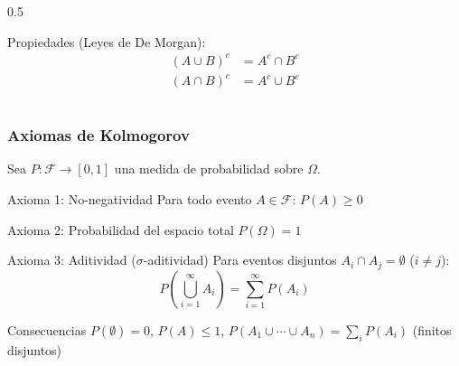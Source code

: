 \documentclass[aspectratio=169,11pt]{beamer}
\begin{document}
\begin{frame}[fragile]
\begin{columns}[T]
\begin{column}{0.5\textwidth}
\begin{center}

\pause
\vspace{0.3cm}
Propiedades (Leyes de De Morgan):
\begin{align*}
(A \cup B)^c &= A^c \cap B^c \\
(A \cap B)^c &= A^c \cup B^c
\end{align*}
\end{center}
\end{column}
\end{columns}
\end{frame}

\begin{frame}[fragile]
\frametitle{Axiomas de Kolmogorov}

\small
Sea $P: \mathcal{F} \to [0,1]$ una medida de probabilidad sobre $\Omega$.

\pause
\vspace{-0.1cm}
\begin{block}{Axioma 1: No-negatividad}
Para todo evento $A \in \mathcal{F}$: $P(A) \geq 0$
\end{block}

\pause
\vspace{-0.1cm}
\begin{block}{Axioma 2: Probabilidad del espacio total}
$P(\Omega) = 1$
\end{block}

\pause
\vspace{-0.1cm}
\begin{block}{Axioma 3: Aditividad ($\sigma$-aditividad)}
Para eventos disjuntos $A_i \cap A_j = \emptyset$ ($i \neq j$):
$$P\left(\bigcup_{i=1}^{\infty} A_i\right) = \sum_{i=1}^{\infty} P(A_i)$$
\end{block}

\pause
\vspace{-0.1cm}
\begin{block}{Consecuencias}
$P(\emptyset) = 0$, \quad $P(A) \leq 1$, \quad $P(A_1 \cup \cdots \cup A_n) = \sum_i P(A_i)$ (finitos disjuntos)
\end{block}
\end{frame}
\end{document}
